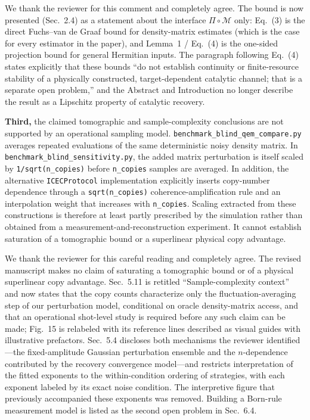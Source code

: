 \documentclass[11pt,a4paper]{article}
\newcommand{\rev}[1]{{\color{black}#1}}
\newcommand{\resp}[1]{{\color{red}#1}}
\begin{document}
\resp{We thank the reviewer for this comment and completely agree. The bound is now presented (Sec.~2.4) as a statement about the interface $\Pi\circ\mathcal{M}$ only: Eq.~(3) is the direct Fuchs--van de Graaf bound for density-matrix estimates (which is the case for every estimator in the paper), and Lemma~1 / Eq.~(4) is the one-sided projection bound for general Hermitian inputs. The paragraph following Eq.~(4) states explicitly that these bounds ``do not establish continuity or finite-resource stability of a physically constructed, target-dependent catalytic channel; that is a separate open problem,'' and the Abstract and Introduction no longer describe the result as a Lipschitz property of catalytic recovery.}

\rev{\textbf{Third,} the claimed tomographic and sample-complexity conclusions are not supported by an operational sampling model. \texttt{benchmark\_blind\_qem\_compare.py} averages repeated evaluations of the same deterministic noisy density matrix. In \texttt{benchmark\_blind\_sensitivity.py}, the added matrix perturbation is itself scaled by \texttt{1/sqrt(n\_copies)} before \texttt{n\_copies} samples are averaged. In addition, the alternative \texttt{ICECProtocol} implementation explicitly inserts copy-number dependence through a \texttt{sqrt(n\_copies)} coherence-amplification rule and an interpolation weight that increases with \texttt{n\_copies}. Scaling extracted from these constructions is therefore at least partly prescribed by the simulation rather than obtained from a measurement-and-reconstruction experiment. It cannot establish saturation of a tomographic bound or a superlinear physical copy advantage.}

\resp{We thank the reviewer for this careful reading and completely agree. The revised manuscript makes no claim of saturating a tomographic bound or of a physical superlinear copy advantage. Sec.~5.11 is retitled ``Sample-complexity context'' and now states that the copy counts characterize only the fluctuation-averaging step of our perturbation model, conditional on oracle density-matrix access, and that an operational shot-level study is required before any such claim can be made; Fig.~15 is relabeled with its reference lines described as visual guides with illustrative prefactors. Sec.~5.4 discloses both mechanisms the reviewer identified---the fixed-amplitude Gaussian perturbation ensemble and the $n$-dependence contributed by the recovery convergence model---and restricts interpretation of the fitted exponents to the within-condition ordering of strategies, with each exponent labeled by its exact noise condition. The interpretive figure that previously accompanied these exponents was removed. Building a Born-rule measurement model is listed as the second open problem in Sec.~6.4.}
\end{document}
